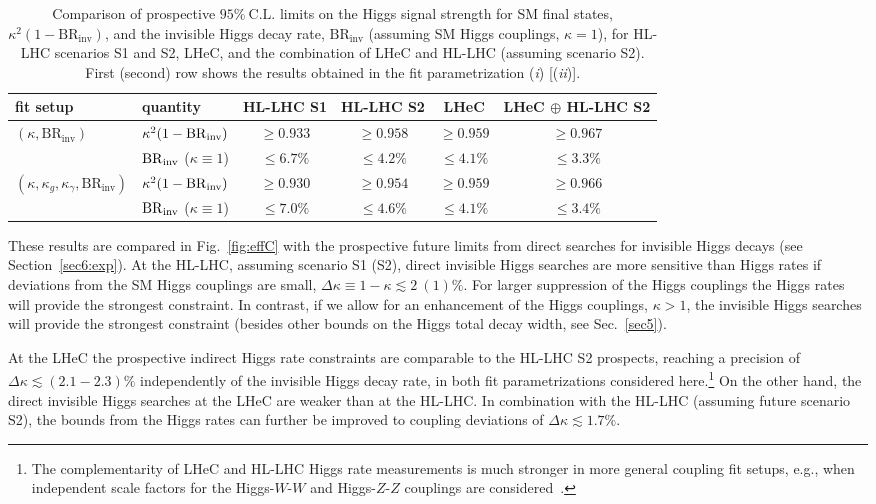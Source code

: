 \documentclass[../report.tex]{subfiles}
\begin{document}
\begin{table}
\centering
\begin{tabular}{ l |  l | cccc}
\hline
fit setup &  quantity   & HL-LHC S1   & HL-LHC S2   & LHeC	  & LHeC $\oplus$ HL-LHC S2 \\
\hline
\multirow{2}{*}{$(\kappa, \mathrm{BR}_\text{inv})$}                         &  $\kappa^2 (1-\mathrm{BR}_\mathrm{inv})$ &  $\ge 0.933$ & $\ge 0.958$ & $\ge 0.959$  & $\ge 0.967$ \\
                                                                            &  $\mathrm{BR}_\mathrm{inv}$ ($\kappa\equiv 1$) & $\le 6.7\%$ & $\le 4.2\% $ & $\le 4.1\%$ & $\le 3.3\%$\\
\hline									  
\multirow{2}{*}{$(\kappa, \kappa_g, \kappa_\gamma,  \mathrm{BR}_\text{inv})$}   &  $\kappa^2 (1-\mathrm{BR}_\mathrm{inv})$ & $\ge0.930$ &  $\ge0.954$ & $\ge0.959$ & $\ge0.966$\\
                                                                                &   $\mathrm{BR}_\mathrm{inv}$ ($\kappa\equiv 1$) & $\le7.0\%$ & $\le4.6\%$ & $\le4.1\%$ & $\le3.4\%$\\

\hline
\end{tabular}
\caption{{Comparison of prospective $95\%~\mathrm{C.L.}$ limits on the Higgs signal strength for SM final states, $\kappa^2(1-\mathrm{BR}_\text{inv})$, and the invisible Higgs decay rate, $\mathrm{BR}_\text{inv}$ (assuming SM Higgs couplings, $\kappa =1$), for HL-LHC scenarios S1 and S2, LHeC, and the combination of LHeC and HL-LHC (assuming scenario S2). First (second) row shows the results obtained in the fit parametrization (\emph{i}) [(\emph{ii})].}}
\label{tab:effC_limits}
\end{table}


These results are compared in Fig.~\ref{fig:effC} with the prospective future limits from direct searches for invisible Higgs decays (see Section~\ref{sec6:exp}). At the HL-LHC, assuming scenario S1 (S2), direct invisible Higgs searches are more sensitive than Higgs rates if deviations from the SM Higgs couplings are small, $\Delta \kappa \equiv 1- \kappa \lesssim 2~(1)\%$. For larger suppression of the Higgs couplings the Higgs rates will provide the strongest constraint. In contrast, if we allow for an enhancement of the Higgs couplings, $\kappa > 1$, the invisible Higgs searches will provide the strongest constraint (besides other bounds on the Higgs total decay width, see Sec.~\ref{sec5}).



At the LHeC the prospective indirect Higgs rate constraints are comparable to the HL-LHC S2 prospects, reaching a precision of $\Delta \kappa \lesssim (2.1-2.3)\%$ independently of the invisible Higgs decay rate, in both fit parametrizations considered here.\footnote{The complementarity of LHeC and HL-LHC Higgs rate measurements is much stronger in more general coupling fit setups, e.g., when independent scale factors for the Higgs-$W$-$W$ and Higgs-$Z$-$Z$ couplings are considered~\cite{uta}.} On the other hand, the direct invisible Higgs searches at the LHeC are weaker than at the HL-LHC. In combination with the HL-LHC (assuming future scenario S2), the bounds from the Higgs rates can further be improved to coupling deviations of $\Delta \kappa \lesssim1.7\%$. 
\end{document}
